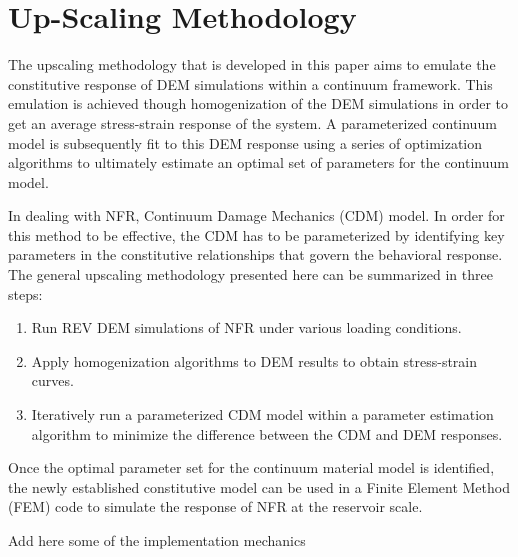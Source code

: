 \section{Up-Scaling Methodology}
The upscaling methodology that is developed in this paper aims to emulate the constitutive response of DEM simulations within a continuum framework. This emulation is achieved though homogenization of the DEM simulations in order to get an average stress-strain response of the system. A parameterized continuum model is subsequently fit to this DEM response using a series of optimization algorithms to ultimately estimate an optimal set of parameters for the continuum model.


In dealing with NFR, Continuum Damage Mechanics (CDM) model. In order for this method to be effective, the CDM has to be parameterized by identifying key parameters in the constitutive relationships that govern the behavioral response. The general upscaling methodology presented here can be summarized in three steps:
\begin{enumerate}
	\item Run REV DEM simulations of NFR under various loading conditions.
	\item Apply homogenization algorithms to DEM results to obtain stress-strain curves.
	\item Iteratively run a parameterized CDM model within a parameter estimation algorithm to minimize the difference between the CDM and DEM responses.
\end{enumerate}
Once the optimal parameter set for the continuum material model is identified, the newly established constitutive model can be used in a Finite Element Method (FEM) code to simulate the response of NFR at the reservoir scale.

Add here some of the implementation mechanics